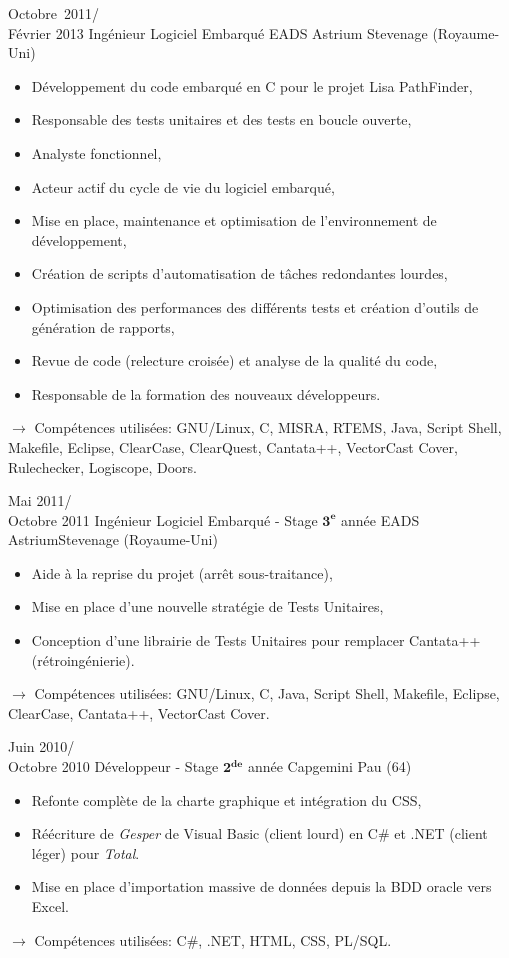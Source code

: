 \documentclass[11pt,a4paper]{moderncv}
\begin{document}
\cventry
{Octobre\ 2011/\\Février 2013}
{Ingénieur Logiciel Embarqué}
{EADS Astrium}
{Stevenage (Royaume-Uni)}
{}
{\begin{itemize}
\item Développement du code embarqué en C pour le projet Lisa PathFinder,
\item Responsable des tests unitaires et des tests en boucle ouverte,
\item Analyste fonctionnel,
\item Acteur actif du cycle de vie du logiciel embarqué,
\item Mise en place, maintenance et optimisation de l'environnement de développement,
\item Création de scripts d'automatisation de tâches redondantes lourdes,
\item Optimisation des performances des différents tests et création d'outils de génération de rapports,
\item Revue de code (relecture croisée) et analyse de la qualité du code,
\item Responsable de la formation des nouveaux développeurs.
\end{itemize}
$\rightarrow$ Compétences utilisées: GNU/Linux, C, MISRA, RTEMS, Java, Script Shell, Makefile, Eclipse, ClearCase, ClearQuest, Cantata++, VectorCast Cover, Rulechecker, Logiscope, Doors.
}   %

\cventry
{Mai 2011/\\Octobre 2011}
{Ingénieur Logiciel Embarqué - Stage $\mathbf{3^{e}}$ année}
{EADS Astrium}{Stevenage (Royaume-Uni)}
{}
{\begin{itemize}
\item Aide à la reprise du projet (arrêt sous-traitance),
\item Mise en place d'une nouvelle stratégie de Tests Unitaires,
\item Conception d'une librairie de Tests Unitaires pour remplacer Cantata++ (rétroingénierie).
\end{itemize}
$\rightarrow$ Compétences utilisées: GNU/Linux, C, Java, Script Shell, Makefile, Eclipse, ClearCase, Cantata++, VectorCast Cover.
}   %

\cventry
{Juin 2010/\\Octobre 2010}
{Développeur - Stage $\mathbf{2^{de}}$ année}
{Capgemini}
{Pau (64)}
{}
{\begin{itemize}
\item Refonte complète de la charte graphique et intégration du CSS,
\item Réécriture de \emph{Gesper} de Visual Basic (client lourd) en C\# et .NET (client léger) pour \emph{Total}.
\item Mise en place d'importation massive de données depuis la BDD oracle vers Excel.
\end{itemize}
$\rightarrow$ Compétences utilisées: C\#, .NET, HTML, CSS, PL/SQL.
}   %
\end{document}
